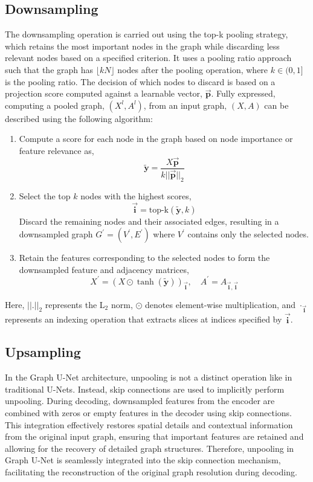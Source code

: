 \subsection{Downsampling}
The downsampling operation is carried out using the top-k pooling strategy, which retains the most important nodes in the graph while discarding less relevant nodes based on a specified criterion. It uses a pooling ratio approach such that the graph has $\lfloor kN \rfloor$ nodes after the pooling operation, where $k \in (0, 1]$ is the pooling ratio. The decision of which nodes to discard is based on a projection score computed against a learnable vector, $\mathbf{\overrightarrow{p}}$. Fully expressed, computing a pooled graph, $(X^l, A^l)$, from an input graph, $(X, A)$ can be described using the following algorithm: 
\begin{enumerate}
    \item Compute a score for each node in the graph based on node importance or feature relevance as,
    \[
\mathbf{\tilde{y}} = \frac{X \mathbf{\overrightarrow{p}}}{k||\mathbf{\overrightarrow{p}}||_2} \]
    \item Select the top $k$ nodes with the highest scores, \[ \mathbf{\overrightarrow{i}} = \text{top-k}(\mathbf{\tilde{y}}, k) \]
    Discard the remaining nodes and their associated edges, resulting in a downsampled graph $G^{\prime} = (V^{\prime}, E^{\prime})$ where $V^{\prime}$ contains only the selected nodes.
    \item Retain the features corresponding to the selected nodes to form the downsampled feature and adjacency matrices, \[
        X^{\prime} = (X \odot \tanh(\mathbf{\tilde{y}}))_{\mathbf{\overrightarrow{i}}}, \quad A^{\prime} = A_{\mathbf{\overrightarrow{i}},\mathbf{\overrightarrow{i}}}
       \]
\end{enumerate}
Here, $||.||_2$ represents the L$_2$ norm, $\odot$ denotes element-wise multiplication, and $\cdot_{\mathbf{\overrightarrow{i}}}$ represents an indexing operation that extracts slices at indices specified by $\mathbf{\overrightarrow{i}}$. 
\subsection{Upsampling}
In the Graph U-Net architecture, unpooling is not a distinct operation like in traditional U-Nets. Instead, skip connections are used to implicitly perform unpooling. During decoding, downsampled features from the encoder are combined with zeros or empty features in the decoder using skip connections. This integration effectively restores spatial details and contextual information from the original input graph, ensuring that important features are retained and allowing for the recovery of detailed graph structures. Therefore, unpooling in Graph U-Net is seamlessly integrated into the skip connection mechanism, facilitating the reconstruction of the original graph resolution during decoding.

